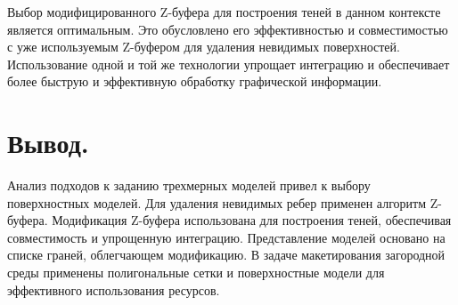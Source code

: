 Выбор модифицированного Z-буфера для построения теней в данном контексте является оптимальным. Это обусловлено его эффективностью и совместимостью с уже используемым Z-буфером для удаления невидимых поверхностей. Использование одной и той же технологии упрощает интеграцию и обеспечивает более быструю и эффективную обработку графической информации.

\section{Вывод.}

Анализ подходов к заданию трехмерных моделей привел к выбору поверхностных моделей. Для удаления невидимых ребер применен алгоритм Z-буфера. Модификация Z-буфера использована для построения теней, обеспечивая совместимость и упрощенную интеграцию. Представление моделей основано на списке граней, облегчающем модификацию. В задаче макетирования загородной среды применены полигональные сетки и поверхностные модели для эффективного использования ресурсов.